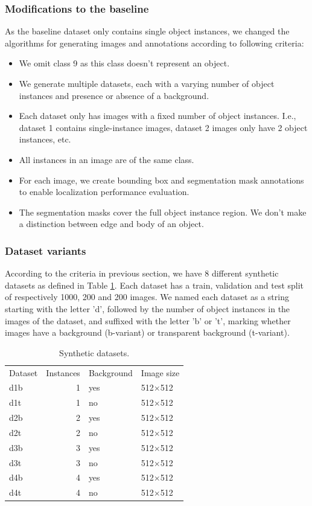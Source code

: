 \subsubsection{Modifications to the baseline}
As the baseline dataset only contains single object instances, we changed the algorithms for generating images and annotations according to following criteria:
\begin{itemize}
    \item We omit class 9 as this class doesn't represent an object.
    \item We generate multiple datasets, each with a varying number of object instances and presence or absence of a background.
    \item Each dataset only has images with a fixed number of object instances. I.e., dataset 1 contains single-instance images, dataset 2 images only have 2 object instances, etc.
    \item All instances in an image are of the same class.
    \item For each image, we create bounding box and segmentation mask annotations to enable localization performance evaluation.
    \item The segmentation masks cover the full object instance region. We don't make a distinction between edge and body of an object.
\end{itemize}

\subsubsection{Dataset variants}
According to the criteria in previous section, we have 8 different synthetic datasets as defined in Table \ref{tab:synthetic_datasets}. Each dataset has a train, validation and test split of respectively 1000, 200 and 200 images.
We named each dataset as a string starting with the letter 'd', followed by the number of object instances in the images of the dataset, and suffixed with the letter 'b' or 't', marking whether images have a background (b-variant) or transparent background (t-variant).
\begin{table}[ht]
\centering
\begin{tabular}{lrll}
  \toprule
  Dataset & Instances & Background & Image size\\
  \cmidrule(lr){1-4}
  d1b & 1 & yes & 512$\times$512\\
  d1t & 1 & no & 512$\times$512\\
  d2b & 2 & yes & 512$\times$512\\
  d2t & 2 & no & 512$\times$512\\
  d3b & 3 & yes & 512$\times$512\\
  d3t & 3 & no & 512$\times$512\\
  d4b & 4 & yes & 512$\times$512\\
  d4t & 4 & no & 512$\times$512\\
  \bottomrule
\end{tabular}
\caption[Synthetic datasets]{Synthetic datasets.}
\label{tab:synthetic_datasets}
\end{table}

